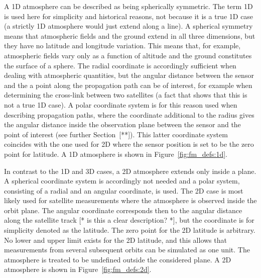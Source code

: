  A 1D atmosphere can be described as being
spherically symmetric. The term 1D is used here for simplicity and
historical reasons, not because it is a true 1D case (a strictly 1D
atmosphere would just extend along a line). A spherical symmetry means
that atmospheric fields and the ground extend in all three dimensions,
but they have no latitude and longitude variation. This means that,
for example, atmospheric fields vary only as a function of altitude
and the ground constitutes the surface of a sphere. The radial
coordinate is accordingly sufficient when dealing with atmospheric
quantities, but the angular distance between the sensor and the a
point along the propagation path can be of interest, for example when
determining the cross-link between two satellites (a fact that shows
that this is not a true 1D case). A polar coordinate system is for
this reason used when describing propagation paths, where the
coordinate additional to the radius gives the angular distance inside
the observation plane between the sensor and the point of interest
(see further Section~[**]).  This latter coordinate system coincides
with the one used for 2D where the sensor position is set to be the
zero point for latitude. A 1D atmosphere is shown in
Figure~\ref{fig:fm_defs:1d}.

 In contrast to the 1D and 3D cases, a 2D
atmosphere extends only inside a plane. A spherical coordinate system
is accordingly not needed and a polar system, consisting of a radial
and an angular coordinate, is used. The 2D case is most likely used
for satellite measurements where the atmosphere is observed inside the
orbit plane. The angular coordinate corresponds then to the angular
distance along the satellite track [* is this a clear description?
*], but the coordinate is for simplicity denoted as the latitude. The
zero point for the 2D latitude is arbitrary. No lower and upper limit
exists for the 2D latitude, and this allows that measurements from
several subsequent orbits can be simulated as one unit. The atmosphere
is treated to be undefined outside the considered plane. A 2D
atmosphere is shown in Figure~\ref{fig:fm_defs:2d}.

